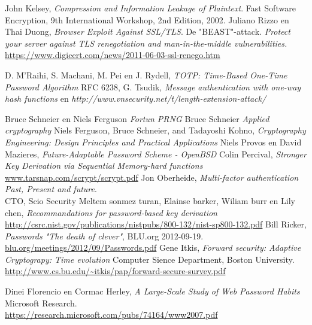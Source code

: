 \documentclass[11pt]{article}
\begin{document}
\begin{thebibliography}{9}

  John Kelsey,
  \emph{{{C}ompression and {I}nformation {L}eakage of {P}laintext}}.
  Fast Software Encryption, 9th International Workshop,
  2nd Edition,
  2002.
	Juliano Rizzo en Thai Duong,
	\emph{Browser Exploit Against SSL/TLS}. De "BEAST"-attack.
	\emph{Protect your server against TLS renegotiation and man-in-the-middle vulnerabilities.}
	\url{https://www.digicert.com/news/2011-06-03-ssl-renego.htm}

	 D. M'Raihi,  S. Machani, M. Pei en  J. Rydell,
	 \emph{TOTP: Time-Based One-Time Password Algorithm}
	 RFC 6238,
	G. Tsudik,
	\emph{Message authentication with one-way hash functions} en
	\emph{http://www.vnsecurity.net/t/length-extension-attack/}
	
	Bruce Schneier en Niels Ferguson
	\emph{Fortun PRNG}
	Bruce Schneier
	\emph{Applied cryptography}
	Niels Ferguson, Bruce Schneier, and Tadayoshi Kohno,
	\emph{Cryptography Engineering: Design Principles and Practical Applications}
	Niels Provos en David Mazieres,
	\emph{Future-Adaptable Password Scheme - OpenBSD}
	Colin Percival,
	\emph{Stronger Key Derivation via Sequential Memory-hard functions}
	\url{www.tarsnap.com/scrypt/scrypt.pdf}
	Jon Oberheide,
	\emph{Multi-factor authentication Past, Present and future}.\\
	CTO, Scio Security
	Meltem sonmez turan, Elainse barker, Wiliam burr en Lily chen,
	\emph{Recommandations for password-based key derivation}\\
	\url{http://csrc.nist.gov/publications/nistpubs/800-132/nist-sp800-132.pdf}
	Bill Ricker,
	\emph{Passwords "The death of clever"}, 
	BLU.org 2012-09-19. \\
	\url{blu.org/meetings/2012/09/Passwords.pdf‎}
	Gene Itkis,
	\emph{Forward security: Adaptive Cryptograpy: Time evolution}
	Computer Sience Department, Boston University.\\
	\url{http://www.cs.bu.edu/~itkis/pap/forward-secure-survey.pdf}
	
	Dinei Florencio en Cormac Herley,
	\emph{A Large-Scale Study of Web Password Habits}
	Microsoft Research.\\
	\url{https://research.microsoft.com/pubs/74164/www2007.pdf}
	

\end{thebibliography}
\end{document}
